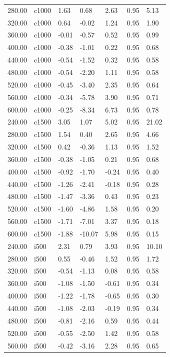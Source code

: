 \documentclass[
  man,floatsintext]{apa6}
\begin{document}
\begin{center}
\begin{ThreePartTable}
{\begin{longtable}{lllllll}
280.00 & c1000 & 1.63 & 0.68 & 2.63 & 0.95 & 5.13\\
320.00 & c1000 & 0.64 & -0.02 & 1.24 & 0.95 & 1.90\\
360.00 & c1000 & -0.01 & -0.57 & 0.52 & 0.95 & 0.99\\
400.00 & c1000 & -0.38 & -1.01 & 0.22 & 0.95 & 0.68\\
440.00 & c1000 & -0.54 & -1.52 & 0.32 & 0.95 & 0.58\\
480.00 & c1000 & -0.54 & -2.20 & 1.11 & 0.95 & 0.58\\
520.00 & c1000 & -0.45 & -3.40 & 2.35 & 0.95 & 0.64\\
560.00 & c1000 & -0.34 & -5.78 & 3.90 & 0.95 & 0.71\\
600.00 & c1000 & -0.25 & -8.34 & 6.73 & 0.95 & 0.78\\
240.00 & c1500 & 3.05 & 1.07 & 5.02 & 0.95 & 21.02\\
280.00 & c1500 & 1.54 & 0.40 & 2.65 & 0.95 & 4.66\\
320.00 & c1500 & 0.42 & -0.36 & 1.13 & 0.95 & 1.52\\
360.00 & c1500 & -0.38 & -1.05 & 0.21 & 0.95 & 0.68\\
400.00 & c1500 & -0.92 & -1.70 & -0.24 & 0.95 & 0.40\\
440.00 & c1500 & -1.26 & -2.41 & -0.18 & 0.95 & 0.28\\
480.00 & c1500 & -1.47 & -3.36 & 0.43 & 0.95 & 0.23\\
520.00 & c1500 & -1.60 & -4.86 & 1.58 & 0.95 & 0.20\\
560.00 & c1500 & -1.71 & -7.01 & 3.37 & 0.95 & 0.18\\
600.00 & c1500 & -1.88 & -10.07 & 5.98 & 0.95 & 0.15\\
240.00 & i500 & 2.31 & 0.79 & 3.93 & 0.95 & 10.10\\
280.00 & i500 & 0.55 & -0.46 & 1.52 & 0.95 & 1.72\\
320.00 & i500 & -0.54 & -1.13 & 0.08 & 0.95 & 0.58\\
360.00 & i500 & -1.08 & -1.50 & -0.61 & 0.95 & 0.34\\
400.00 & i500 & -1.22 & -1.78 & -0.65 & 0.95 & 0.30\\
440.00 & i500 & -1.08 & -2.03 & -0.19 & 0.95 & 0.34\\
480.00 & i500 & -0.81 & -2.16 & 0.59 & 0.95 & 0.44\\
520.00 & i500 & -0.55 & -2.50 & 1.42 & 0.95 & 0.58\\
560.00 & i500 & -0.42 & -3.16 & 2.28 & 0.95 & 0.65\\

\end{longtable}}
\end{ThreePartTable}
\end{center}
\end{document}
